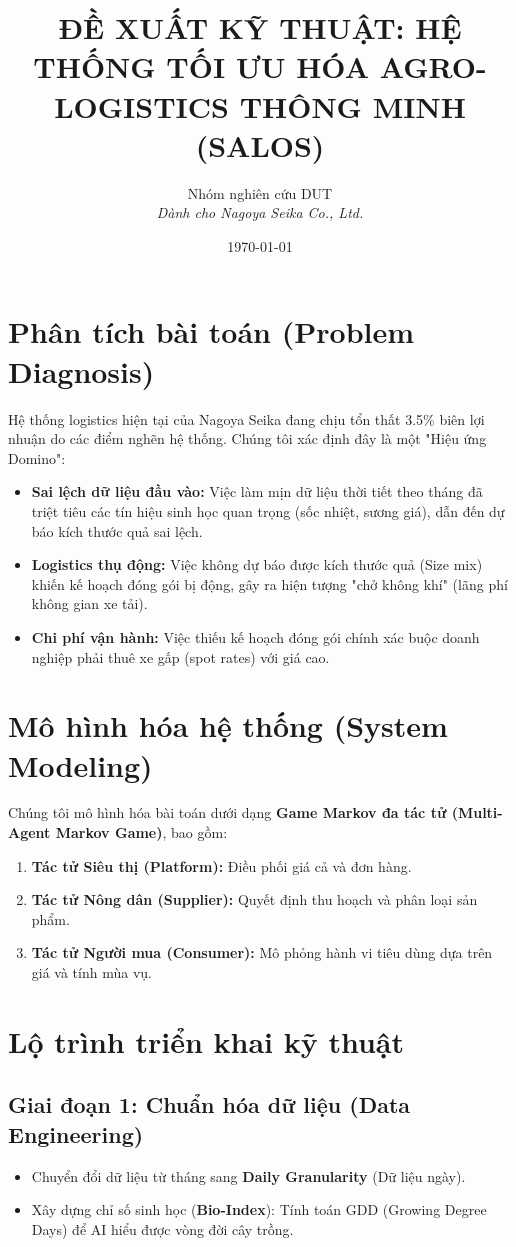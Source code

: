 \documentclass[12pt, a4paper]{article}
\title{\textbf{ĐỀ XUẤT KỸ THUẬT: HỆ THỐNG TỐI ƯU HÓA AGRO-LOGISTICS THÔNG MINH (SALOS)}}
\author{Nhóm nghiên cứu DUT \\ \textit{Dành cho Nagoya Seika Co., Ltd.}}
\date{\today}
\begin{document}
\maketitle

\section{Phân tích bài toán (Problem Diagnosis)}
Hệ thống logistics hiện tại của Nagoya Seika đang chịu tổn thất 3.5\% biên lợi nhuận do các điểm nghẽn hệ thống. Chúng tôi xác định đây là một "Hiệu ứng Domino":
\begin{itemize}
    \item \textbf{Sai lệch dữ liệu đầu vào:} Việc làm mịn dữ liệu thời tiết theo tháng đã triệt tiêu các tín hiệu sinh học quan trọng (sốc nhiệt, sương giá), dẫn đến dự báo kích thước quả sai lệch.
    \item \textbf{Logistics thụ động:} Việc không dự báo được kích thước quả (Size mix) khiến kế hoạch đóng gói bị động, gây ra hiện tượng "chở không khí" (lãng phí không gian xe tải).
    \item \textbf{Chi phí vận hành:} Việc thiếu kế hoạch đóng gói chính xác buộc doanh nghiệp phải thuê xe gấp (spot rates) với giá cao.
\end{itemize}

\section{Mô hình hóa hệ thống (System Modeling)}
Chúng tôi mô hình hóa bài toán dưới dạng \textbf{Game Markov đa tác tử (Multi-Agent Markov Game)}, bao gồm:
\begin{enumerate}
    \item \textbf{Tác tử Siêu thị (Platform):} Điều phối giá cả và đơn hàng.
    \item \textbf{Tác tử Nông dân (Supplier):} Quyết định thu hoạch và phân loại sản phẩm.
    \item \textbf{Tác tử Người mua (Consumer):} Mô phỏng hành vi tiêu dùng dựa trên giá và tính mùa vụ.
\end{enumerate}

\section{Lộ trình triển khai kỹ thuật}

\subsection{Giai đoạn 1: Chuẩn hóa dữ liệu (Data Engineering)}
\begin{itemize}
    \item Chuyển đổi dữ liệu từ tháng sang \textbf{Daily Granularity} (Dữ liệu ngày).
    \item Xây dựng chỉ số sinh học (\textbf{Bio-Index}): Tính toán GDD (Growing Degree Days) để AI hiểu được vòng đời cây trồng.
\end{itemize}
\end{document}
